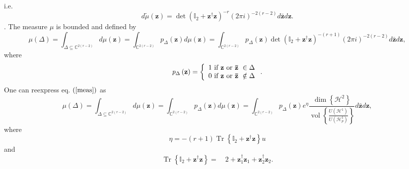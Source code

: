 \documentclass[aps,preprint]{revtex4}%
\begin{document}
i.e.
\begin{equation}
d\tilde{\mu}\left(  \mathbf{z}\right)  =\det\left(  \mathbb{I}_{2}%
+\mathbf{z}^{\dagger}\mathbf{z}\right)  ^{-r}\left(  2\pi i\right)
^{-2\left(  r-2\right)  }d\mathbf{\bar{z}}d\mathbf{z.}%
\end{equation}
\cite{Blaiz&Orland}. The measure $\mu$ is bounded \cite{Gilmore} and defined
by
\begin{equation}
\mu\left(  \Delta\right)  =\int_{\Delta\subseteq\mathbb{C}^{2\left(
r-2\right)  }}d\mu\left(  \mathbf{z}\right)  =\int_{\mathbb{C}^{2\left(
r-2\right)  }}\mathit{p}_{\Delta}\left(  \mathbf{z}\right)  d\mu\left(
\mathbf{z}\right)  =\int_{\mathbb{C}^{2\left(  r-2\right)  }}\mathit{p}%
_{\Delta}\left(  \mathbf{z}\right)  \det\left(  \mathbb{I}_{2}+\mathbf{z}%
^{\dagger}\mathbf{z}\right)  ^{-\left(  r+1\right)  }\left(  2\pi i\right)
^{-2\left(  r-2\right)  }d\mathbf{\bar{z}}d\mathbf{z,} \label{meas}%
\end{equation}
where
\begin{equation}
\mathit{p}_{\Delta}\left(  \mathbf{z}\right)  =\left\{
\begin{array}
[c]{c}%
1\text{ if }\mathbf{z}\text{ or }\mathbf{\bar{z}}\text{ }\in\Delta\\
0\text{ if }\mathbf{z}\text{ or }\mathbf{\bar{z}}\text{ }\notin\Delta
\end{array}
\right.  .
\end{equation}
One can reexpress eq. $\left(  \ref{meas}\right)  $ as
\begin{equation}
\mu\left(  \Delta\right)  =\int_{\Delta\subseteq\mathbb{C}^{2\left(
r-2\right)  }}d\mu\left(  \mathbf{z}\right)  =\int_{\mathbb{C}^{2\left(
r-2\right)  }}\mathit{p}_{\Delta}\left(  \mathbf{z}\right)  d\mu\left(
\mathbf{z}\right)  =\int_{\mathbb{C}^{2\left(  r-2\right)  }}\mathit{p}%
_{\Delta}\left(  \mathbf{z}\right)  e^{\eta}\frac{\dim\left\{  \mathcal{H}%
^{2}\right\}  }{\operatorname*{vol}\left\{  \frac{U\left(  \mathcal{H}%
^{1}\right)  }{U\left(  \mathcal{H}_{p}^{1}\right)  }\right\}  }%
d\mathbf{\bar{z}}d\mathbf{z,}%
\end{equation}
where
\begin{equation}
\eta=-\left(  r+1\right)  \operatorname*{Tr}\left\{  \mathbb{I}_{2}%
+\mathbf{z}^{\dagger}\mathbf{z}\right\}  u
\end{equation}
and%
\begin{equation}
\operatorname*{Tr}\left\{  \mathbb{I}_{2}+\mathbf{z}^{\dagger}\mathbf{z}%
\right\}  =\quad2+\mathbf{z}_{1}^{\dagger}\mathbf{z}_{1}+\mathbf{z}%
_{2}^{\dagger}\mathbf{z}_{2}.
\end{equation}
\end{document}
